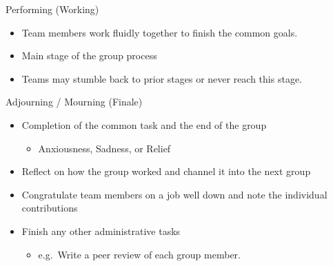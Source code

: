 \begin{frame}{Performing (Working)}

\begin{itemize}
\tightlist
\item
  Team members work fluidly together to finish the common goals.
\item
  Main stage of the group process
\item
  Teams may stumble back to prior stages or never reach this stage.
\end{itemize}

\end{frame}

\begin{frame}{Adjourning / Mourning (Finale)}

\begin{itemize}
\tightlist
\item
  Completion of the common task and the end of the group

  \begin{itemize}
  \tightlist
  \item
    Anxiousness, Sadness, or Relief
  \end{itemize}
\item
  Reflect on how the group worked and channel it into the next group
\item
  Congratulate team members on a job well down and note the individual
  contributions
\item
  Finish any other administrative tasks

  \begin{itemize}
  \tightlist
  \item
    e.g.~Write a peer review of each group member.
  \end{itemize}
\end{itemize}

\end{frame}

